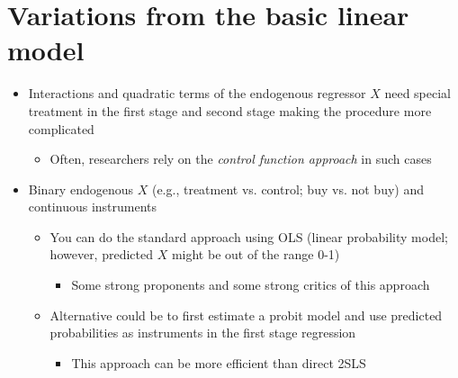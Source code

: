 \documentclass[10pt]{article}
\begin{document}
\section{Variations from the basic linear model}
\begin{itemize}
    \item Interactions and quadratic terms of the endogenous regressor $X $ need special treatment in the first stage and second stage making the procedure more complicated 
    \begin{itemize}
        \item Often, researchers rely on the \textit{control function approach} in such cases
    \end{itemize}
    \item Binary endogenous $X $ (e.g., treatment vs. control; buy vs. not buy) and continuous instruments 
    \begin{itemize}
        \item You can do the standard approach using OLS (linear probability model; however, predicted $X $ might be out of the range 0-1)
        \begin{itemize}
            \item Some strong proponents and some strong critics of this approach 
        \end{itemize}
        \item Alternative could be to first estimate a probit model and use predicted probabilities as instruments in the first stage regression
        \begin{itemize}
            \item This approach can be more efficient than direct 2SLS 
        \end{itemize}
    \end{itemize}
\end{itemize}
\end{document}
